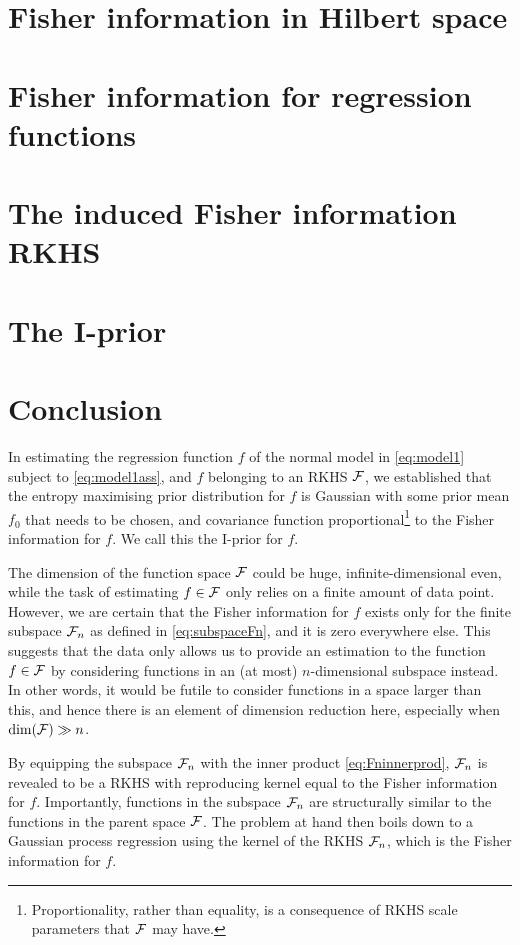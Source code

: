 \documentclass[a4paper,showframe,11pt]{report}
\begin{document}
\section{Fisher information in Hilbert space}
\label{sec:fihilbert}

%

\section{Fisher information for regression functions}
\label{sec:firegfun}


\section{The induced Fisher information RKHS}
\label{sec:inducedFisherRKHS}


\section{The I-prior}


\section{Conclusion}

In estimating the regression function $f$ of the normal model in \cref{eq:model1} subject to \cref{eq:model1ass}, and $f$ belonging to an RKHS ${\mathcal F}$, we established that the entropy maximising prior distribution for $f$ is Gaussian with some prior mean $f_0$ that needs to be chosen, and covariance function proportional\footnote{Proportionality, rather than equality, is a consequence of RKHS scale parameters that ${\mathcal F}$ may have.} to the Fisher information for $f$.
We call this the I-prior for $f$.

The dimension of the function space ${\mathcal F}$ could be huge, infinite-dimensional even, while the task of estimating $f\in{\mathcal F}$ only relies on a finite amount of data point.
However, we are certain that the Fisher information for $f$ exists only for the finite subspace ${\mathcal F}_n$ as defined in \cref{eq:subspaceFn}, and it is zero everywhere else.
This suggests that the data only allows us to provide an estimation to the function $f\in{\mathcal F}$ by considering functions in an (at most) $n$-dimensional subspace instead.
In other words, it would be futile to consider functions in a space larger than this, and hence there is an element of dimension reduction here, especially when $\dim({\mathcal F}) \gg n$.

By equipping the subspace ${\mathcal F}_n$ with the inner product \cref{eq:Fninnerprod}, ${\mathcal F}_n$ is revealed to be a RKHS with reproducing kernel equal to the Fisher information for $f$.
Importantly, functions in the subspace ${\mathcal F}_n$ are structurally similar to the functions in the parent space ${\mathcal F}$.
The problem at hand then boils down to a Gaussian process regression using the kernel of the RKHS ${\mathcal F}_n$, which is the Fisher information for $f$.

\hClosingStuffStandalone
\end{document}
